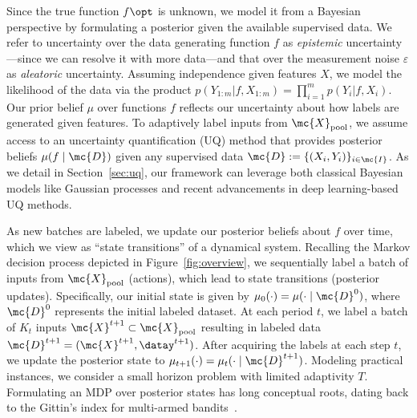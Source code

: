   Since the true function $f\opt$ is unknown, we  model it from a Bayesian perspective by formulating a posterior given the available supervised data. We refer to uncertainty over the data generating function $f$ as \emph{epistemic} uncertainty---since we can resolve it with more data---and that over
 the measurement noise $\varepsilon$ as \emph{aleatoric} uncertainty. 
Assuming independence given features $X$, we model the  likelihood of the data via the product 
$p({Y}_{1:m}|f, {X}_{1:m}) = \prod_{i=1}^m p(Y_i|f,X_i)$.
 Our prior belief  $\mu$ over functions $f$   reflects our uncertainty about how
labels are generated given features. 
To adaptively label inputs from $\mc{X}_{\rm pool}$, we assume access to an uncertainty quantification (UQ) method that provides posterior beliefs $\mu(f \mid \mc{D})$ given
any supervised data $\mc{D}:= \{(X_i,Y_i)\}_{i \in \mc{I}}$. As we detail  in Section~\ref{sec:uq}, our framework can leverage both classical 
Bayesian models like Gaussian processes and recent advancements in deep learning-based UQ  methods.

As new batches are labeled, we update our posterior beliefs about $f$ over time, which we view as ``state transitions'' of a dynamical system.
Recalling the Markov decision process depicted in Figure~\ref{fig:overview}, we sequentially label a batch of inputs from $\mc{X}_{\rm pool}$ (actions), which lead to state transitions (posterior updates).
Specifically, our initial state is given by $\mu_0(\cdot) = \mu(\cdot \mid \mc{D}^0)$, where $\mc{D}^0$ represents the initial labeled dataset.
At each period $t$, we label a batch of $K_t$ inputs $\mc{X}^{t+1} \subset \mc{X}_{\rm pool}$ resulting in labeled data $ \mc{D}^{t+1} = (\mc{X}^{t+1}, \datay^{t+1})$. After acquiring the labels at each step $t$, we update the posterior state to $\mu_{t+1}(\cdot) = \mu_t(\cdot \mid \mc{D}^{t+1})$. Modeling practical instances, we consider a small horizon problem with limited adaptivity $T$. Formulating an MDP over posterior states has long conceptual roots, dating back to the Gittin's index for multi-armed bandits~\citep{Gittins79}.

